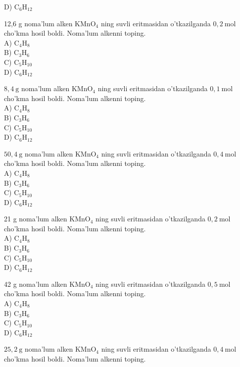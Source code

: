 D) $\mathrm{C}_{6} \mathrm{H}_{12}$
  \item 12,6 g noma'lum alken $\mathrm{KMnO}_{4}$ ning suvli eritmasidan o'tkazilganda $0,2 \mathrm{~mol}$ cho'kma hosil boldi. Noma'lum alkenni toping.\\
A) $\mathrm{C}_{4} \mathrm{H}_{8}$\\
B) $\mathrm{C}_{3} \mathrm{H}_{6}$\\
C) $\mathrm{C}_{5} \mathrm{H}_{10}$\\
D) $\mathrm{C}_{6} \mathrm{H}_{12}$
  \item $8,4 \mathrm{~g}$ noma'lum alken $\mathrm{KMnO}_{4}$ ning suvli eritmasidan o'tkazilganda $0,1 \mathrm{~mol}$ cho'kma hosil boldi. Noma'lum alkenni toping.\\
A) $\mathrm{C}_{4} \mathrm{H}_{8}$\\
B) $\mathrm{C}_{3} \mathrm{H}_{6}$\\
C) $\mathrm{C}_{5} \mathrm{H}_{10}$\\
D) $\mathrm{C}_{6} \mathrm{H}_{12}$
  \item $50,4 \mathrm{~g}$ noma'lum alken $\mathrm{KMnO}_{4}$ ning suvli eritmasidan o'tkazilganda $0,4 \mathrm{~mol}$ cho'kma hosil boldi. Noma'lum alkenni toping.\\
A) $\mathrm{C}_{4} \mathrm{H}_{8}$\\
B) $\mathrm{C}_{3} \mathrm{H}_{6}$\\
C) $\mathrm{C}_{5} \mathrm{H}_{10}$\\
D) $\mathrm{C}_{6} \mathrm{H}_{12}$
  \item 21 g noma'lum alken $\mathrm{KMnO}_{4}$ ning suvli eritmasidan o'tkazilganda $0,2 \mathrm{~mol}$ cho'kma hosil boldi. Noma'lum alkenni toping.\\
A) $\mathrm{C}_{4} \mathrm{H}_{8}$\\
B) $\mathrm{C}_{3} \mathrm{H}_{6}$\\
C) $\mathrm{C}_{5} \mathrm{H}_{10}$\\
D) $\mathrm{C}_{6} \mathrm{H}_{12}$
  \item 42 g noma'lum alken $\mathrm{KMnO}_{4}$ ning suvli eritmasidan o'tkazilganda $0,5 \mathrm{~mol}$ cho'kma hosil boldi. Noma'lum alkenni toping.\\
A) $\mathrm{C}_{4} \mathrm{H}_{8}$\\
B) $\mathrm{C}_{3} \mathrm{H}_{6}$\\
C) $\mathrm{C}_{5} \mathrm{H}_{10}$\\
D) $\mathrm{C}_{6} \mathrm{H}_{12}$
  \item $25,2 \mathrm{~g}$ noma'lum alken $\mathrm{KMnO}_{4}$ ning suvli eritmasidan o'tkazilganda $0,4 \mathrm{~mol}$ cho'kma hosil boldi. Noma'lum alkenni toping.\\
